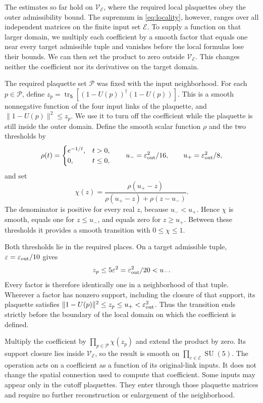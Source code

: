 \documentclass[11pt,a4paper]{article}
\theoremstyle{remark}
\DeclareMathOperator{\tr}{tr}
\DeclareMathOperator{\SU}{SU}
\newcommand{\eps}{\varepsilon}
\begin{document}
The estimates so far hold on $\mathcal V_{\mathcal E}$, where the
required local plaquettes obey the outer admissibility bound. The
supremum in \eqref{eq:locality}, however, ranges over all independent
matrices on the finite input set $\mathcal E$. To supply a function
on that larger domain, we multiply each coefficient by a smooth factor
that equals one near every target admissible tuple and vanishes before
the local formulas lose their bounds. We can then set the product to
zero outside $\mathcal V_{\mathcal E}$. This changes neither the
coefficient nor its derivatives on the target domain.

The required plaquette set $\mathcal P$ was fixed with the input
neighborhood. For each $p\in\mathcal P$, define
$z_p=\tr_{\mathbf5}[(1-U(p))^\dagger(1-U(p))]$.
This is a smooth nonnegative function of the four input links of the
plaquette, and $\|1-U(p)\|^2\le z_p$. We use it to turn off
the coefficient while the plaquette is still inside the outer domain.
Define the smooth scalar function $\rho$ and the two thresholds by
\begin{equation}
 \rho(t)=
 \begin{cases}e^{-1/t},&t>0,\\0,&t\le0,\end{cases}
 \qquad u_-=\eps_{\rm out}^2/16,
 \qquad u_+=\eps_{\rm out}^2/8,
\end{equation}
and set
\begin{equation}
 \chi(z)=\frac{\rho(u_+-z)}
                   {\rho(u_+-z)+\rho(z-u_-)}.
 \label{poly:cutoff}
\end{equation}
The denominator is positive for every real $z$, because
$u_-<u_+$. Hence $\chi$ is smooth, equals one for $z\le u_-$,
and equals zero for $z\ge u_+$. Between these thresholds it provides
a smooth transition with $0\le\chi\le1$.

Both thresholds lie in the required places. On a target admissible
tuple, $\eps=\eps_{\rm out}/10$ gives
\begin{equation}
 z_p\le5\eps^2=\eps_{\rm out}^2/20<u_-.
\end{equation}
Every factor is therefore identically one in a neighborhood of that
tuple. Wherever a factor has nonzero support, including the closure of
that support, its plaquette satisfies
$\|1-U(p)\|^2\le z_p\le u_+<\eps_{\rm out}^2$.
Thus the transition ends strictly before the boundary of the local
domain on which the coefficient is defined.

Multiply the coefficient by
$\prod_{p\in\mathcal P}\chi(z_p)$ and extend the product by zero.
Its support closure lies inside $\mathcal V_{\mathcal E}$, so the
result is smooth on $\prod_{e\in\mathcal E}\SU(5)$. The operation
acts on a coefficient as a function of its original-link inputs. It
does not change the spatial connection used to compute that coefficient.
Some inputs may appear only in the cutoff plaquettes. They enter through
those plaquette matrices and require no further reconstruction or
enlargement of the neighborhood.
\end{document}
